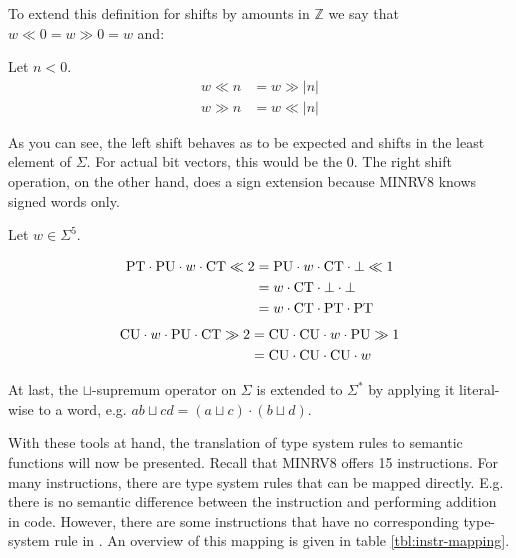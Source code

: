 To extend this definition for shifts by amounts in $ \mathbb{Z} $ we say that $ w \ll 0 = w \gg 0 = w $ and:

Let $ n < 0 $.
\begin{align*}
    w \ll n &= w \gg |n| \\
    w \gg n &= w \ll |n|
\end{align*}

As you can see, the left shift behaves as to be expected and shifts in the least element of $ \Sigma $.
For actual bit vectors, this would be the 0.
The right shift operation, on the other hand, does a sign extension because MINRV8 knows signed words only.

\begin{example}
    Let $ w \in \Sigma^5 $.

    \begin{align*}
        \text{PT} \cdot \text{PU} \cdot w \cdot \text{CT} \ll 2 &= \text{PU} \cdot w \cdot \text{CT} \cdot \bot \ll 1 \\
        &= w \cdot \text{CT} \cdot \bot \cdot \bot \\
        &= w \cdot \text{CT} \cdot \text{PT} \cdot \text{PT}
    \end{align*}
    \begin{align*}
        \text{CU} \cdot w \cdot \text{PU} \cdot \text{CT} \gg 2 &= \text{CU} \cdot \text{CU} \cdot w \cdot \text{PU} \gg 1 \\
        &= \text{CU} \cdot \text{CU} \cdot \text{CU} \cdot w
    \end{align*}
\end{example}

At last, the $ \sqcup $-supremum operator on $ \Sigma $ is extended to $ \Sigma^* $ by applying it literal-wise to a word, e.g. $ ab \sqcup cd = (a \sqcup c) \cdot (b \sqcup d) $.

With these tools at hand, the translation of type system rules to semantic functions will now be presented.
Recall that MINRV8 offers 15 instructions.
For many instructions, there are type system rules that can be mapped directly.
E.g. there is no semantic difference between the  instruction and performing addition in code.
However, there are some instructions that have no corresponding type-system rule in \cite{Ferraiuolo17}.
An overview of this mapping is given in table \ref{tbl:instr-mapping}.

